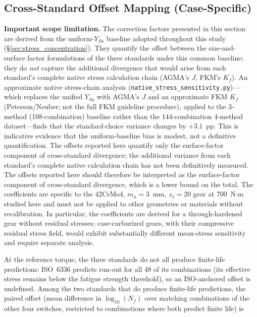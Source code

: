 \documentclass[twocolumn,12pt,a4paper]{article}
\begin{document}
\subsection{Cross-Standard Offset Mapping (Case-Specific)}

\textbf{Important scope limitation.} The correction factors presented
in this section are derived from the uniform-$Y_{Sa}$ baseline
adopted throughout this study (\S\ref{sec:stress_concentration}). They
quantify the offset between the size-and-surface factor formulations
of the three standards under this common baseline; they do \emph{not}
capture the additional divergence that would arise from each
standard's complete native stress calculation chain (AGMA's $J$,
FKM's $K_f$). An approximate native stress-chain analysis
(\texttt{native\_stress\_sensitivity.py})---which replaces the
unified $Y_{Sa}$ with AGMA's $J$ and an approximate FKM $K_f$
(Peterson/Neuber; not the full FKM guideline procedure), applied
to the 3-method (108-combination) baseline rather than the
144-combination 4-method dataset---finds that the standard-choice
variance changes by $+3.1$~pp. This is indicative evidence that
the uniform-baseline bias is modest, not a definitive
quantification. The offsets reported here quantify only the
surface-factor component of cross-standard divergence; the
additional variance from each standard's complete native calculation
chain has not been definitively measured. The offsets reported here should
therefore be interpreted as the surface-factor component of
cross-standard divergence, which is a lower bound on the total. The coefficients are specific
to the 42CrMo4, $m_n=3$~mm, $z_1=20$ gear at 700~N$\cdot$m
studied here and must not be applied to other geometries or materials
without recalibration. In particular, the coefficients are derived
for a through-hardened gear without residual stresses; case-carburized
gears, with their compressive residual stress field, would exhibit
substantially different mean-stress sensitivity and require separate
analysis.

At the reference torque, the three standards do not all produce
finite-life predictions: ISO~6336 predicts run-out for all 48 of its
combinations (its effective stress remains below the fatigue strength
threshold), so an ISO-anchored offset is undefined. Among the two
standards that do produce finite-life predictions, the paired offset
(mean difference in $\log_{10}(N_f)$ over matching combinations of the
other four switches, restricted to combinations where both predict
finite life) is
\end{document}
